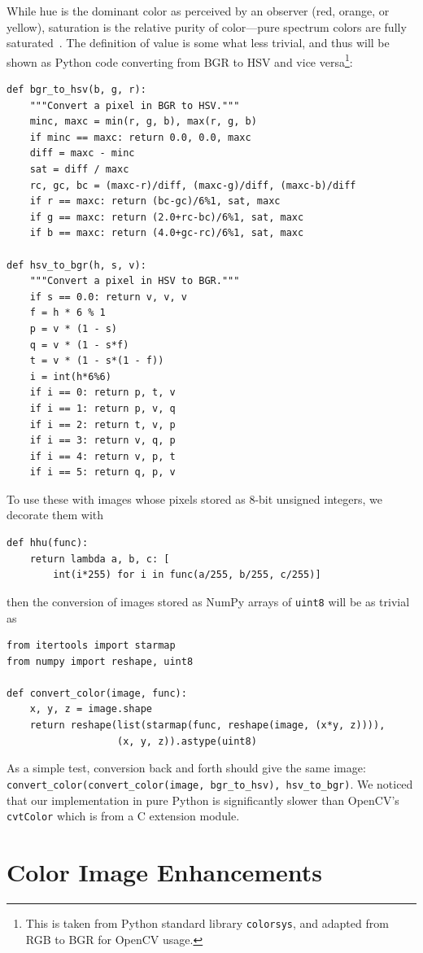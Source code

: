 \documentclass[a4paper,12pt]{article}
\begin{document}
While hue is the dominant color as perceived by an observer (red, orange,
or yellow), saturation is the relative purity of color---pure spectrum colors
are fully saturated~\cite{cs5420}.  The definition of value is some what less
trivial, and thus will be shown as Python code converting from BGR to HSV
and vice versa\footnote{This is taken from Python standard library
\texttt{colorsys}, and adapted from RGB to BGR for OpenCV usage.}:
\begin{verbatim}
def bgr_to_hsv(b, g, r):
    """Convert a pixel in BGR to HSV."""
    minc, maxc = min(r, g, b), max(r, g, b)
    if minc == maxc: return 0.0, 0.0, maxc
    diff = maxc - minc
    sat = diff / maxc
    rc, gc, bc = (maxc-r)/diff, (maxc-g)/diff, (maxc-b)/diff
    if r == maxc: return (bc-gc)/6%1, sat, maxc
    if g == maxc: return (2.0+rc-bc)/6%1, sat, maxc
    if b == maxc: return (4.0+gc-rc)/6%1, sat, maxc

def hsv_to_bgr(h, s, v):
    """Convert a pixel in HSV to BGR."""
    if s == 0.0: return v, v, v
    f = h * 6 % 1
    p = v * (1 - s)
    q = v * (1 - s*f)
    t = v * (1 - s*(1 - f))
    i = int(h*6%6)
    if i == 0: return p, t, v
    if i == 1: return p, v, q
    if i == 2: return t, v, p
    if i == 3: return v, q, p
    if i == 4: return v, p, t
    if i == 5: return q, p, v
\end{verbatim}

To use these with images whose pixels stored as 8-bit unsigned integers,
we decorate them with
\begin{verbatim}
def hhu(func):
    return lambda a, b, c: [
        int(i*255) for i in func(a/255, b/255, c/255)]
\end{verbatim}
then the conversion of images stored as NumPy arrays of \verb|uint8|
will be as trivial as
\begin{verbatim}
from itertools import starmap
from numpy import reshape, uint8

def convert_color(image, func):
    x, y, z = image.shape
    return reshape(list(starmap(func, reshape(image, (x*y, z)))),
                   (x, y, z)).astype(uint8)
\end{verbatim}

As a simple test, conversion back and forth should give the same image:
\verb|convert_color(convert_color(image, bgr_to_hsv), hsv_to_bgr)|.
We noticed that our implementation in pure Python is significantly slower
than OpenCV's \verb|cvtColor| which is from a C extension module.


\section{Color Image Enhancements}
\end{document}
